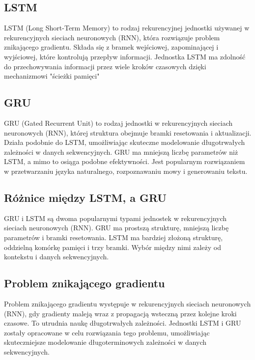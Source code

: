 \documentclass{article}
\begin{document}
    \subsection{LSTM}
    LSTM (Long Short-Term Memory) to rodzaj rekurencyjnej jednostki używanej w rekurencyjnych sieciach neuronowych (RNN), która rozwiązuje problem znikającego gradientu. Składa się z bramek wejściowej, zapominającej i wyjściowej, które kontrolują przepływ informacji. Jednostka LSTM ma zdolność do przechowywania informacji przez wiele kroków czasowych dzięki mechanizmowi "ścieżki pamięci"
    \subsection{GRU}
    GRU (Gated Recurrent Unit) to rodzaj jednostki w rekurencyjnych sieciach neuronowych (RNN), której struktura obejmuje bramki resetowania i aktualizacji. Działa podobnie do LSTM, umożliwiając skuteczne modelowanie długotrwałych zależności w danych sekwencyjnych. GRU ma mniejszą liczbę parametrów niż LSTM, a mimo to osiąga podobne efektywności. Jest popularnym rozwiązaniem w przetwarzaniu języka naturalnego, rozpoznawaniu mowy i generowaniu tekstu.
    \subsection{Różnice między LSTM, a GRU}
    GRU i LSTM są dwoma popularnymi typami jednostek w rekurencyjnych sieciach neuronowych (RNN). GRU ma prostszą strukturę, mniejszą liczbę parametrów i bramki resetowania. LSTM ma bardziej złożoną strukturę, oddzielną komórkę pamięci i trzy bramki. Wybór między nimi zależy od kontekstu i danych sekwencyjnych.
    \subsection{Problem znikającego gradientu}
    Problem znikającego gradientu występuje w rekurencyjnych sieciach neuronowych (RNN), gdy gradienty maleją wraz z propagacją wsteczną przez kolejne kroki czasowe. To utrudnia naukę długotrwałych zależności. Jednostki LSTM i GRU zostały opracowane w celu rozwiązania tego problemu, umożliwiając skuteczniejsze modelowanie długoterminowych zależności w danych sekwencyjnych.
\end{document}

